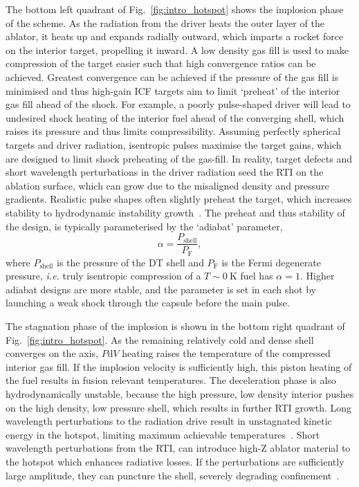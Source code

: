 The bottom left quadrant of Fig.~\ref{fig:intro_hotspot} shows the implosion phase of the scheme.
As the radiation from the driver heats the outer layer of the ablator, it heats up and expands radially outward, which imparts a rocket force on the interior target, propelling it inward.
A low density gas fill is used to make compression of the target easier such that high convergence ratios can be achieved.
Greatest convergence can be achieved if the pressure of the gas fill is minimised and thus high-gain \ac{ICF} targets aim to limit `preheat' of the interior gas fill ahead of the shock.
For example, a poorly pulse-shaped driver will lead to undesired shock heating of the interior fuel ahead of the converging shell, which raises its pressure and thus limits compressibility.
Assuming perfectly spherical targets and driver radiation, isentropic pulses maximise the target gains, which are designed to limit shock preheating of the gas-fill.
In reality, target defects and short wavelength perturbations in the driver radiation seed the \ac{RTI} on the ablation surface, which can grow due to the misaligned density and pressure gradients.
Realistic pulse shapes often slightly preheat the target, which increases stability to hydrodynamic instability growth~\cite{goncharov_improved_2003,hurricane_highfoot_2014}.
The preheat and thus stability of the design, is typically parameterised by the `adiabat' parameter,
\begin{equation}
    \label{eq:intro_adiabat}
    \alpha = \frac{P_{\text{shell}}}{P_{\text{F}}},
\end{equation}
where $P_{\text{shell}}$ is the pressure of the DT shell and $P_{\text{F}}$ is the Fermi degenerate pressure, \textit{i.e.} truly isentropic compression of a $T\sim0\ \text{K}$ fuel has $\alpha=1$.
Higher adiabat designs are more stable, and the parameter is set in each shot by launching a weak shock through the capsule before the main pulse.

The stagnation phase of the implosion is shown in the bottom right quadrant of Fig.~\ref{fig:intro_hotspot}.
As the remaining relatively cold and dense shell converges on the axis, $P\text{d}V$ heating raises the temperature of the compressed interior gas fill.
If the implosion velocity is sufficiently high, this piston heating of the fuel results in fusion relevant temperatures.
The deceleration phase is also hydrodynamically unstable, because the high pressure, low density interior pushes on the high density, low pressure shell, which results in further \ac{RTI} growth.
Long wavelength perturbations to the radiation drive result in unstagnated kinetic energy in the hotspot, limiting maximum achievable temperatures~\cite{gatujohnson_impact_2018}.
Short wavelength perturbations from the \ac{RTI}, can introduce high-Z ablator material to the hotspot which enhances radiative losses.
If the perturbations are sufficiently large amplitude, they can puncture the shell, severely degrading confinement~\cite{smalyuk_review_2020}.

